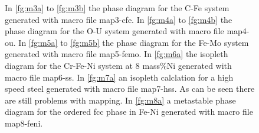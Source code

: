 \documentclass[12pt]{article}
\begin{document}
\begin{figure}
\begin{center}
%
%
%
%
%
%
\end{center}
%
\caption{ In \ref{fg:m3a} to \ref{fg:m3b} the phase diagram for the
  C-Fe system generated with macro file map3-cfe.  In \ref{fg:m4a} to
  \ref{fg:m4b} the phase diagram for the O-U system generated with
  macro file map4-ou.  In \ref{fg:m5a} to \ref{fg:m5b} the phase
  diagram for the Fe-Mo system generated with macro file map5-femo.
  In \ref{fg:m6a} the isopleth diagram for the Cr-Fe-Ni system at 8
  mass\%Ni generated with macro file map6-ss.  In \ref{fg:m7a} an
  isopleth calclation for a high speed steel generated with macro file
  map7-hss.  As can be seen there are still problems with mapping.  In
  \ref{fg:m8a} a metastable phase diagram for the ordered fcc phase in
  Fe-Ni generated with macro file map8-feni.  }
\end{figure}
\end{document}
